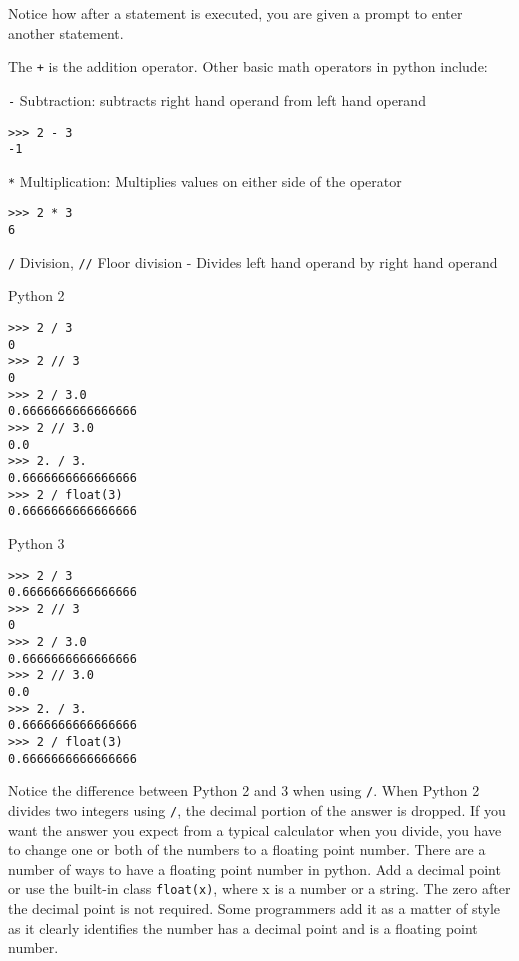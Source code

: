 \documentclass[12pt]{article}
\begin{document}
Notice how after a statement is executed, you are given a prompt to enter another statement.

The \texttt{+} is the addition operator. Other basic math operators in python include:

\texttt{-} Subtraction: subtracts right hand operand from left hand operand

\begin{lstlisting}[style=bash]
>>> 2 - 3
-1
\end{lstlisting}

\texttt{*} Multiplication: Multiplies values on either side of the operator

\begin{lstlisting}[style=bash]
>>> 2 * 3
6
\end{lstlisting}


\texttt{/} Division, \texttt{//} Floor division - Divides left hand operand by right hand operand
\\

\begin{minipage}{.5\linewidth}
Python 2
\begin{lstlisting}[style=bash]
>>> 2 / 3
0
>>> 2 // 3
0
>>> 2 / 3.0
0.6666666666666666
>>> 2 // 3.0
0.0
>>> 2. / 3.
0.6666666666666666
>>> 2 / float(3)
0.6666666666666666
\end{lstlisting}
\end{minipage}
\begin{minipage}{.5\linewidth}
Python 3
\begin{lstlisting}[style=bash]
>>> 2 / 3
0.6666666666666666
>>> 2 // 3
0
>>> 2 / 3.0
0.6666666666666666
>>> 2 // 3.0
0.0
>>> 2. / 3.
0.6666666666666666
>>> 2 / float(3)
0.6666666666666666
\end{lstlisting}
\end{minipage}

Notice the difference between Python 2 and 3 when using \texttt{/}. When Python 2 divides two integers using \texttt{/}, the decimal portion of the answer is dropped. If you want the answer you expect from a typical calculator when you divide, you have to change one or both of the numbers to a floating point number. There are a number of ways to have a floating point number in python. Add a decimal point or use the built-in class \texttt{float(x)}, where x is a number or a string. The zero after the decimal point is not required. Some programmers add it as a matter of style as it clearly identifies the number has a decimal point and is a floating point number.
\end{document}

